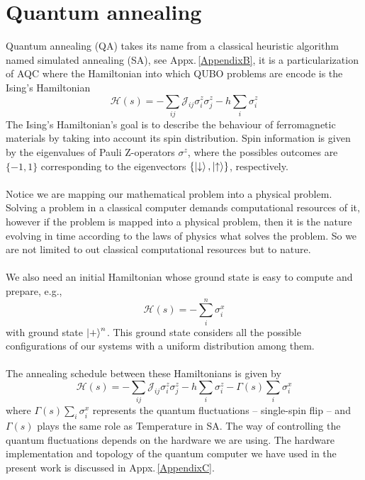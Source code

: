 \section{Quantum annealing}
Quantum annealing (QA) takes its name from a classical heuristic algorithm named simulated annealing (SA), see Appx.\,\ref{AppendixB}, it is a particularization of AQC where the Hamiltonian into which QUBO problems are encode is the Ising's Hamiltonian
\begin{equation}
    \mathcal{H}(s) = -\sum_{ij}\mathcal{J}_{ij}\sigma_{i}^{z}\sigma_{j}^{z} - h\sum_{i}\sigma_{i}^{z}
\end{equation}
The Ising's Hamiltonian's goal is to describe the behaviour of ferromagnetic materials by taking into account its spin distribution. Spin information is given by the eigenvalues of Pauli Z-operators $\sigma^{z}$, where the possibles outcomes are $\{-1,1\}$ corresponding to the eigenvectors $\{\ket{\downarrow},\ket{\uparrow}\}$, respectively.\\\\
Notice we are mapping our mathematical problem into a physical problem. Solving a problem in a classical computer demands computational resources of it, however if the problem is mapped into a physical problem, then it is the nature evolving in time according to the laws of physics what solves the problem. So we are not limited to out classical computational resources but to nature.\\\\
We also need an initial Hamiltonian whose ground state is easy to compute and prepare, e.g.,
\begin{equation}
    \mathcal{H}(s) = -\sum_{i}^{n}\sigma_{i}^{x}
\end{equation}
with ground state $\ket{+}^{n}$. This ground state considers all the possible configurations of our systems with a uniform distribution among them.\\\\
The annealing schedule between these Hamiltonians is given by
\begin{equation}
    \mathcal{H}(s) = -\sum_{ij}\mathcal{J}_{ij}\sigma_{i}^{z}\sigma_{j}^{z} - h\sum_{i}\sigma_{i}^{z} - \Gamma(s)\sum_{i}\sigma_{i}^{x}
\end{equation}
where $\Gamma(s)\sum_{i}\sigma_{i}^{x}$ represents the quantum fluctuations -- single-spin flip -- and $\Gamma(s)$ plays the same role as Temperature in SA. The way of controlling the quantum fluctuations depends on the hardware we are using. The hardware implementation and topology of the quantum computer we have used in the present work is discussed in Appx.\,\ref{AppendixC}.\\\\
